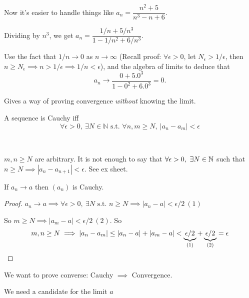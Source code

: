 \documentclass[twoside]{scrartcl}
\begin{document}
\begin{remark}
 Now it's easier to handle things like $a_n = \dfrac{n^2 + 5}{n^3 - n + 6}$.

Dividing by $n^3$, we get $a_n = \dfrac{1/n + 5/n^3}{1 - 1/n^2 + 6/n^3}$.

 Use the fact that $1/n \to 0$ as $n \to \infty$ (Recall proof: $\forall \epsilon >0$, let $N_\epsilon  > 1/\epsilon$, then $n\geq N_{\epsilon} \implies n > 1/\epsilon \implies 1/n < \epsilon$), and the algebra of limits to deduce that 
\[a_n \to \dfrac{0 + 5.0^3}{1 - 0^2 + 6.0^3} = 0.\]
\end{remark}




Gives a way of proving convergence \emph{without} knowing the limit.\\

\begin{definition}
	A sequence is Cauchy iff
	\[\forall \epsilon >0,~\exists N \in \mathbb{N} \text{ s.t. } \forall n,m \geq N,~ |a_n - a_m| < \epsilon\]
\end{definition}~

\begin{remark}
$m,n \geq N$ are arbitrary. It is not enough to say that $\forall \epsilon >0,~\exists N \in \mathbb{N}$ such that $n \geq N \implies |a_n - a_{n+1}| < \epsilon$. See ex sheet. 	
\end{remark}

\begin{proposition}	
If $a_n \to a$ then $(a_n)$ is Cauchy. 
\end{proposition}
\begin{proof}
$a_n \to a\implies \forall \epsilon >0,~\exists N \text{ s.t. } n \geq N \implies |a_n - a| < \epsilon/2 ~(1)$


So $m \geq N \implies |a_m - a| < \epsilon /2 ~(2)$. So \[m,n \geq N \implies |a_n - a_m| \leq |a_n - a| + |a_m - a| < \underbrace{\epsilon/2}_{(1)} + \underbrace{\epsilon/2}_{(2)}=\epsilon\qedhere\]
\end{proof}

We want to prove converse: Cauchy $\implies$ Convergence.

We need a candidate for the limit $a$
\end{document}
